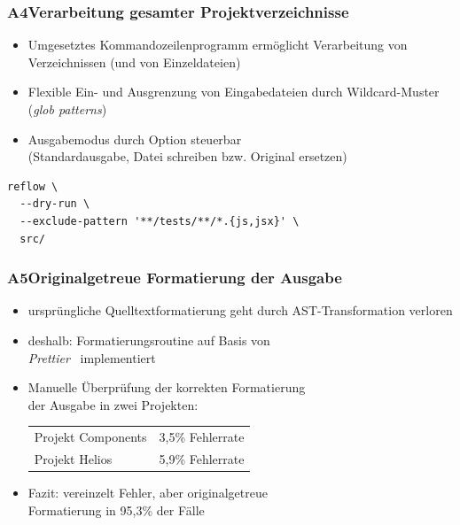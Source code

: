       \begin{frame}[fragile]
        \frametitle{A4\hspace{0.75em}Verarbeitung gesamter Projektverzeichnisse}
        \begin{itemize}
          \item Umgesetztes Kommandozeilenprogramm ermöglicht Verarbeitung von Verzeichnissen (und von Einzeldateien)
          \item Flexible Ein- und Ausgrenzung von Eingabedateien durch Wildcard-Muster (\textit{glob patterns})
          \item Ausgabemodus durch Option steuerbar\\(Standardausgabe, Datei schreiben bzw. Original ersetzen)
        \end{itemize}

        \bigskip
        \begin{lstlisting}[numbers=none]
reflow \
  --dry-run \
  --exclude-pattern '**/tests/**/*.{js,jsx}' \
  src/
        \end{lstlisting}
      \end{frame}

      \begin{frame}
        \frametitle{A5\hspace{0.75em}Originalgetreue Formatierung der Ausgabe}
        \begin{itemize}
          \item ursprüngliche Quelltextformatierung geht durch AST-Transformation verloren
          \item deshalb: Formatierungsroutine auf Basis von\\\textit{Prettier}~\autocite{SOFTWARE:PRETTIER} implementiert
          \item Manuelle Überprüfung der korrekten Formatierung\\der Ausgabe in zwei Projekten:\\
            \medskip
            {
              \footnotesize
              \begin{tabu} to 
                Projekt Components & 3,5\% Fehlerrate \\
                Projekt Helios     & 5,9\% Fehlerrate \\
              \end{tabu}
            }
          \item Fazit: vereinzelt Fehler, aber originalgetreue\\Formatierung in 95,3\% der Fälle
        \end{itemize}
      \end{frame}

